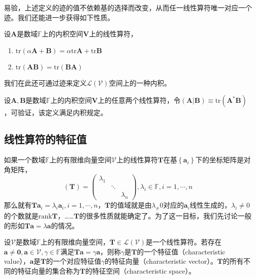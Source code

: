 \documentclass[main.tex]{subfiles}
\begin{document}
易验，上述定义的迹的值不依赖基的选择而改变，从而任一线性算符唯一对应一个迹。我们还能进一步获得如下性质。

\begin{theorem}
设$\mathbf{A}$是数域$\mathbb{F}$上的内积空间$\mathbf{V}$上的线性算符，
\begin{enumerate}
    \item $\mathrm{tr}\left(\alpha\mathbf{A}+\mathbf{B}\right)=\alpha\mathrm{tr}\mathbf{A}+\mathrm{tr}\mathbf{B}$
    \item $\mathrm{tr}\left(\mathbf{AB}\right)=\mathrm{tr}\left(\mathbf{BA}\right)$
\end{enumerate}
\end{theorem}

我们在此还可通过迹来定义$\mathcal{L}\left(\mathcal{V}\right)$空间上的一种内积。

\begin{theorem}
设$\mathbf{A},\mathbf{B}$是数域$\mathbb{F}$上的内积空间$\mathbf{V}$上的任意两个线性算符，令$\left(\mathbf{A}|\mathbf{B}\right)\equiv\mathrm{tr}\left(\mathbf{A}^*\mathbf{B}\right)$，可验证，该定义满足内积规定。
\end{theorem}

\subsection{线性算符的特征值}
如果一个数域$\mathbb{F}$上的有限维向量空间$\mathcal{V}$上的线性算符$\mathbf{T}$在基$\left\{\mathbf{a}_i\right\}$下的坐标矩阵是对角矩阵，
\[\left(\mathbf{T}\right)=\left(\begin{array}{ccc}\lambda_1&&\\&\ddots&\\&&\lambda_n\end{array}\right),\lambda_i\in\mathbb{F},i=1,\cdots,n\]
那么就有$\mathbf{Ta}_i=\lambda_i \mathbf{a}_i,i=1,\cdots,n$，$\mathbf{T}$的值域就是由$\lambda_\neq 0$对应的$\mathbf{a}_i$线性生成的，$\lambda_i\neq 0$的个数就是$\mathrm{rank}\mathbf{T}$，……$\mathbf{T}$的很多性质就能确定了。为了这一目标，我们先讨论一般的形如$\mathbf{Ta}=\lambda\mathbf{a}$的情况。

\begin{definition}
设$\mathcal{V}$是数域$\mathbb{F}$上的有限维向量空间，$\mathbf{T}\in\mathcal{L}\left(\mathcal{V}\right)$是一个线性算符。若存在$\mathbf{a}\neq\mathbf{0},\mathbf{a}\in\mathcal{V},\gamma\in\mathbb{F}$满足$\mathbf{Ta}=\gamma\mathbf{a}$，则称$\gamma$是$\mathbf{T}$的一个特征值（characteristic value），$\mathbf{a}$是$\mathbf{T}$的一个对应特征值$\gamma$的特征向量（characteristic vector）。$\mathbf{T}$的所有不同的特征向量的集合称为$\mathbf{T}$的特征空间（characteristic space）。
\end{definition}
\end{document}
